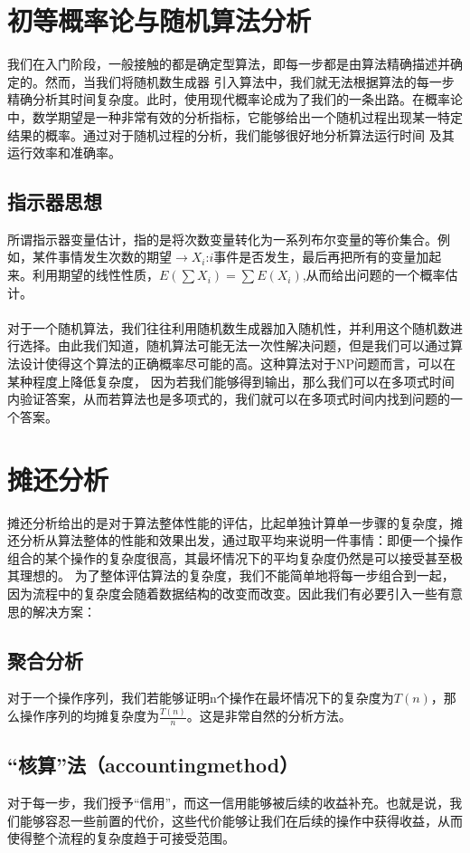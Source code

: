 \documentclass[12pt,a4paper,UTF16]{ctexbook}
\theoremstyle{plain}
\begin{document}
\section{初等概率论与随机算法分析}
我们在入门阶段，一般接触的都是确定型算法，即每一步都是由算法精确描述并确定的。然而，当我们将随机数生成器
引入算法中，我们就无法根据算法的每一步精确分析其时间复杂度。此时，使用现代概率论成为了我们的一条出路。在概率论中，数学期望是一种非常有效的分析指标，它能够给出一个随机过程出现某一特定结果的概率。通过对于随机过程的分析，我们能够很好地分析算法运行时间
及其运行效率和准确率。
\subsection{指示器思想}
所谓指示器变量估计，指的是将次数变量转化为一系列布尔变量的等价集合。例如，某件事情发生次数的期望$\to X_i$:$i$事件是否发生，最后再把所有的变量加起来。利用期望的线性性质，$E(\sum X_i)=\sum E(X_i)$,从而给出问题的一个概率估计。
\paragraph{}
对于一个随机算法，我们往往利用随机数生成器加入随机性，并利用这个随机数进行选择。由此我们知道，随机算法可能无法一次性解决问题，但是我们可以通过算法设计使得这个算法的正确概率尽可能的高。这种算法对于NP问题而言，可以在某种程度上降低复杂度，
因为若我们能够得到输出，那么我们可以在多项式时间内验证答案，从而若算法也是多项式的，我们就可以在多项式时间内找到问题的一个答案。
\section{摊还分析}
摊还分析给出的是对于算法整体性能的评估，比起单独计算单一步骤的复杂度，摊还分析从算法整体的性能和效果出发，通过取平均来说明一件事情：即便一个操作组合的某个操作的复杂度很高，其最坏情况下的平均复杂度仍然是可以接受甚至极其理想的。
为了整体评估算法的复杂度，我们不能简单地将每一步组合到一起，因为流程中的复杂度会随着数据结构的改变而改变。因此我们有必要引入一些有意思的解决方案：
\subsection{聚合分析}
对于一个操作序列，我们若能够证明n个操作在最坏情况下的复杂度为$T(n)$，那么操作序列的均摊复杂度为$\frac{T(n)}{n}$。这是非常自然的分析方法。
\subsection{“核算”法（accounting\space method）}
对于每一步，我们授予“信用”，而这一信用能够被后续的收益补充。也就是说，我们能够容忍一些前置的代价，这些代价能够让我们在后续的操作中获得收益，从而使得整个流程的复杂度趋于可接受范围。
\end{document}
